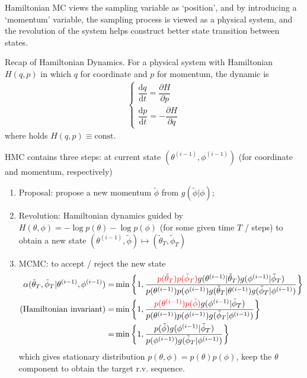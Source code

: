 Hamiltonian MC views the sampling variable as `position', and by introducing a `momentum' variable, the sampling process is viewed as a physical system, and the revolution of the system helps construct better state transition between states.

Recap of Hamiltonian Dynamics. For a physical system with Hamiltonian $ H(q,p) $ in which $ q $ for coordinate and $ p $ for momentum, the dynamic is
\begin{align}
     \begin{cases}
        \dfrac{ \mathrm{d}q }{ \mathrm{d}t }=\dfrac{ \partial H }{ \partial p }\\
        \dfrac{ \mathrm{d}p }{ \mathrm{d}t }=-\dfrac{ \partial H }{ \partial q }
     \end{cases}
\end{align}
where holds $ H(q,p)\equiv\mathrm{const} $.


HMC contains three steps: at current state $ (\theta^{(i-1)} ,\phi^{(i-1)} ) $ (for coordinate and momentum, respectively)
\begin{enumerate}[topsep=2pt,itemsep=2pt]
    \item Proposal: propose a new momentum $ \tilde{\phi  } $ from $ g(\tilde{\phi  }|\phi   ) $;
    \item Revolution: Hamiltonian dynamics guided by $ H(\theta ,\phi )= -\log p(\theta )-\log p(\phi )  $ (for some given time $ T $ / steps) to obtain a new state $ (\theta ^{(i-1)},\tilde{\phi })\mapsto (\tilde{\theta }_T, \tilde{\phi }_T) $
    \item MCMC: to accept / reject the new state
    \begin{align}
        \alpha (\tilde{\theta }_T,\tilde{\phi }_T|\theta ^{(i-1)},\phi ^{(i-1)} )=&\min\bigg\{ 1,\dfrac{ {\color{red}p(\tilde{\theta }_T)p(\tilde{\phi }_T)}g(\theta ^{(i-1)}|\tilde{\theta }_T)g(\phi ^{(i-1)}|\tilde{\phi }_T) }{ p(\theta ^{(i-1)})p(\phi ^{(i-1)})g(\tilde{\theta }_T|\theta ^{(i-1)})g(\tilde{\phi }_T|\phi ^{(i-1)}) }   \bigg\}\\
        (\text{Hamiltonian invariant})=&\min\bigg\{ 1,\dfrac{ {\color{red}p(\theta ^{(i-1)})p(\tilde{\phi })}g(\phi ^{(i-1)}|\tilde{\phi }_T) }{ p(\theta ^{(i-1)})p(\phi ^{(i-1)})g(\tilde{\phi }_T|\phi ^{(i-1)}) }   \bigg\}\\
        =&\min\bigg\{ 1,\dfrac{p(\tilde{\phi })g(\phi ^{(i-1)}|\tilde{\phi }_T) }{ p(\phi ^{(i-1)})g(\tilde{\phi }_T|\phi ^{(i-1)}) }   \bigg\}
    \end{align}
    which gives stationary distribution $ p(\theta ,\phi )=p(\theta )p(\phi ) $, keep the $ \theta  $ component to obtain the target r.v. sequence.
\end{enumerate}

